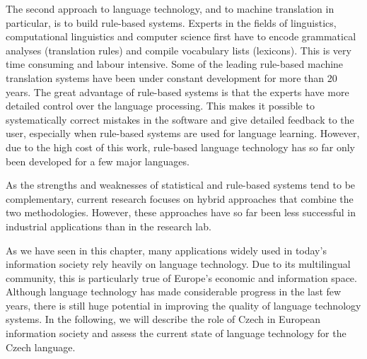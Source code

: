 \begin{multicols}{2}
The second approach to language technology, and to machine translation in particular, is to build rule-based systems. Experts in the fields of linguistics, computational linguistics and computer science first have to encode grammatical analyses (translation rules) and compile vocabulary lists (lexicons). This is very time consuming and labour intensive. Some of the leading rule-based machine translation systems have been under constant development for more than 20 years. The great advantage of rule-based systems is that the experts have more detailed control over the language processing. This makes it possible to systematically correct mistakes in the software and give detailed feedback to the user, especially when rule-based systems are used for language learning. However, due to the high cost of this work, rule-based language technology has so far only been developed for a few major languages.

As the strengths and weaknesses of statistical and rule-based systems tend to be complementary, current research focuses on hybrid approaches that combine the two methodologies. However, these approaches have so far been less successful in industrial applications than in the research lab.

As we have seen in this chapter, many applications widely used in today’s information society rely heavily on language technology. Due to its multilingual community, this is particularly true of Europe’s economic and information space. Although language technology has made considerable progress in the last few years, there is still huge potential in improving the quality of language technology systems. In the following, we will describe the role of Czech in European information society and assess the current state of language technology for the Czech language.
\end{multicols}
\clearpage


